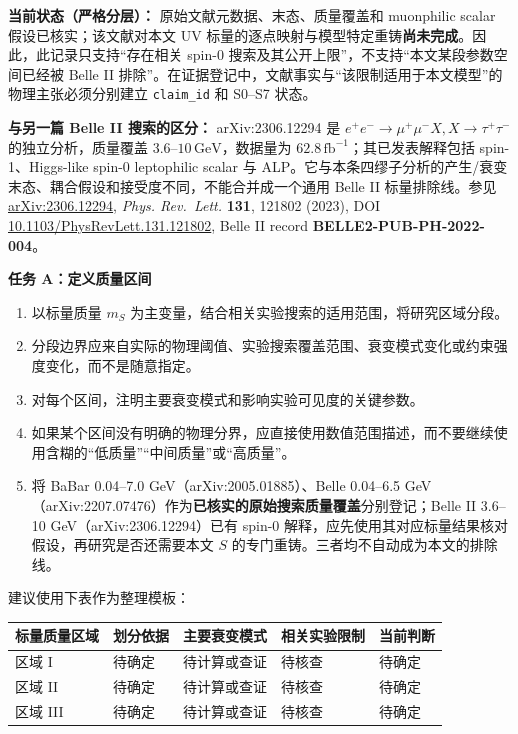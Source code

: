 \documentclass[
]{article}
\providecommand{\tightlist}{%
  \setlength{\itemsep}{0pt}\setlength{\parskip}{0pt}}
\begin{document}
\textbf{当前状态（严格分层）：} 原始文献元数据、末态、质量覆盖和
muonphilic scalar 假设已核实；该文献对本文 UV
标量的逐点映射与模型特定重铸\textbf{尚未完成}。因此，此记录只支持``存在相关
spin-0 搜索及其公开上限''，不支持``本文某段参数空间已经被 Belle II
排除''。在证据登记中，文献事实与``该限制适用于本文模型''的物理主张必须分别建立
\texttt{claim\_id} 和 S0--S7 状态。

\textbf{与另一篇 Belle II 搜索的区分：} arXiv:2306.12294 是
\(e^+e^-\to\mu^+\mu^-X, X\to\tau^+\tau^-\) 的独立分析，质量覆盖
\(3.6\text{--}10\,\mathrm{GeV}\)，数据量为
\(62.8\,\mathrm{fb}^{-1}\)；其已发表解释包括 spin-1、Higgs-like spin-0
leptophilic scalar 与
ALP。它与本条四缪子分析的产生/衰变末态、耦合假设和接受度不同，不能合并成一个通用
Belle II 标量排除线。参见
\href{https://arxiv.org/abs/2306.12294}{arXiv:2306.12294}, \emph{Phys.
Rev.~Lett.} \textbf{131}, 121802 (2023), DOI
\href{https://doi.org/10.1103/PhysRevLett.131.121802}{10.1103/PhysRevLett.131.121802},
Belle II record \textbf{BELLE2-PUB-PH-2022-004}。

\textbf{任务 A：定义质量区间}

\begin{enumerate}
\def\labelenumi{\arabic{enumi}.}
\tightlist
\item
  以标量质量 \(m_S\)
  为主变量，结合相关实验搜索的适用范围，将研究区域分段。
\item
  分段边界应来自实际的物理阈值、实验搜索覆盖范围、衰变模式变化或约束强度变化，而不是随意指定。
\item
  对每个区间，注明主要衰变模式和影响实验可见度的关键参数。
\item
  如果某个区间没有明确的物理分界，应直接使用数值范围描述，而不要继续使用含糊的``低质量''``中间质量''或``高质量''。
\item
  将 BaBar 0.04--7.0 GeV（arXiv:2005.01885）、Belle 0.04--6.5
  GeV（arXiv:2207.07476）作为\textbf{已核实的原始搜索质量覆盖}分别登记；Belle
  II 3.6--10 GeV（arXiv:2306.12294）已有 spin-0
  解释，应先使用其对应标量结果核对假设，再研究是否还需要本文 \(S\)
  的专门重铸。三者均不自动成为本文的排除线。
\end{enumerate}

建议使用下表作为整理模板：

\begin{longtable}[]{@{}lllll@{}}
\toprule\noalign{}
标量质量区域 & 划分依据 & 主要衰变模式 & 相关实验限制 & 当前判断 \\
\midrule\noalign{}
\endhead
\bottomrule\noalign{}
\endlastfoot
区域 I & 待确定 & 待计算或查证 & 待核查 & 待确定 \\
区域 II & 待确定 & 待计算或查证 & 待核查 & 待确定 \\
区域 III & 待确定 & 待计算或查证 & 待核查 & 待确定 \\
\end{longtable}
\end{document}
